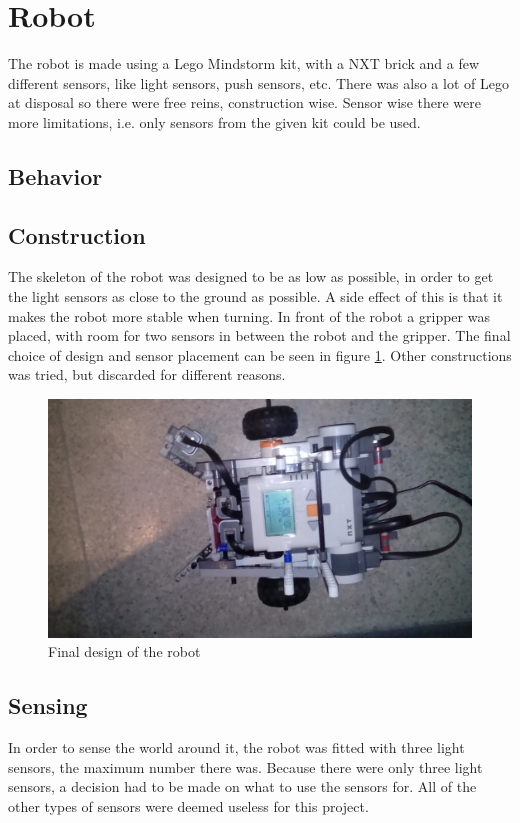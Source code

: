 \section{Robot} 

The robot is made using a Lego Mindstorm kit, with a NXT brick and a few different sensors, like light sensors, push sensors, etc. There was also a lot of Lego at disposal so there were free reins, construction wise. Sensor wise there were more limitations, i.e. only sensors from the given kit could be used.
\subsection{Behavior}

\subsection{Construction}
The skeleton of the robot was designed to be as low as possible, in order to get the light sensors as close to the ground as possible. A side effect of this is that it makes the robot more stable when turning. In front of the robot a gripper was placed, with room for two sensors in between the robot and the gripper. The final choice of design and sensor placement can be seen in figure \ref{fig:final_robot}. Other constructions was tried, but discarded for different reasons.

\begin{figure}[H]
\centering
 \includegraphics[scale = 0.1]{img/robot.jpg}
 \caption{Final design of the robot}
 \label{fig:final_robot}
\end{figure}


\subsection{Sensing}
In order to sense the world around it, the robot was fitted with three light sensors, the maximum number there was. Because there were only three light sensors, a decision had to be made on what to use the sensors for. All of the other types of sensors were deemed useless for this project.

